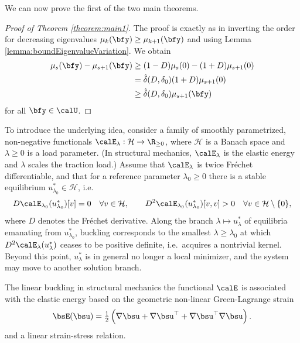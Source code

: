 We can now prove the first of the two main theorems.
\begin{proof}[Proof of Theorem \ref{theorem:main1}]
    The proof is exactly as in  \cite[Corollary 1]{grubišić2021stochasticcollocationmethodcomputing} inverting the order for decreasing eigenvalues $\mu_k(\bfy) \geq \mu_{k+1}(\bfy)$ and using Lemma \ref{lemma:boundEigenvalueVariation}.
    We obtain
    \begin{align*}
    \mu_{s}(\bfy) - \mu_{s+1}(\bfy)  &\geq  (1-D)\mu_s(0) - (1+D)\mu_{s+1}(0) \\
    & =  \hat \delta(D, \delta_0) (1+D) \mu_{s+1}(0) \\
    &\geq  \hat \delta(D, \delta_0)  \mu_{s+1}(\bfy)
    \end{align*}
    for all  $\bfy \in \calU$.
\end{proof}




To introduce the underlying idea, consider a family of smoothly parametrized, non-negative functionals $\calE_\lambda : \mathcal{H} \to \R_{\geq 0}$, where $\mathcal{H}$ is a Banach space and $\lambda \geq 0$ is a load parameter. (In structural mechanics, $\calE_\lambda$ is the elastic energy and $\lambda$ scales the traction load.) Assume that $\calE_\lambda$ is twice Fr\'echet differentiable, and that for a reference parameter $\lambda_0 \geq 0$ there is a stable equilibrium $u^*_{\lambda_0} \in \mathcal{H}$, i.e.
\begin{align*}
    D\calE_{\lambda_0}(u^*_{\lambda_0})[v] = 0 \quad \forall v \in \mathcal{H},
    \qquad
    D^2 \calE_{\lambda_0}(u^*_{\lambda_0})[v,v] > 0 \quad \forall v \in \mathcal{H}\setminus\{0\},
\end{align*}
where $D$ denotes the Fr\'echet derivative.
Along the branch $\lambda \mapsto u^*_\lambda$ of equilibria emanating from $u^*_{\lambda_0}$, buckling corresponds to the smallest $\lambda \geq \lambda_0$ at which $D^2\calE_\lambda(u^*_\lambda)$ ceases to be positive definite, i.e.\ acquires a nontrivial kernel. Beyond this point, $u^*_\lambda$ is in general no longer a local minimizer, and the system may move to another solution branch.

The linear buckling in structural mechanics the functional $\calE$ is associated with the elastic energy based on the geometric non-linear Green-Lagrange strain
\begin{align*}
    \bsE(\bsu) = \tfrac12 \left( \nabla \bsu + \nabla \bsu^\top + \nabla \bsu^\top \nabla \bsu \right).
\end{align*}
and a linear strain-stress relation. 


